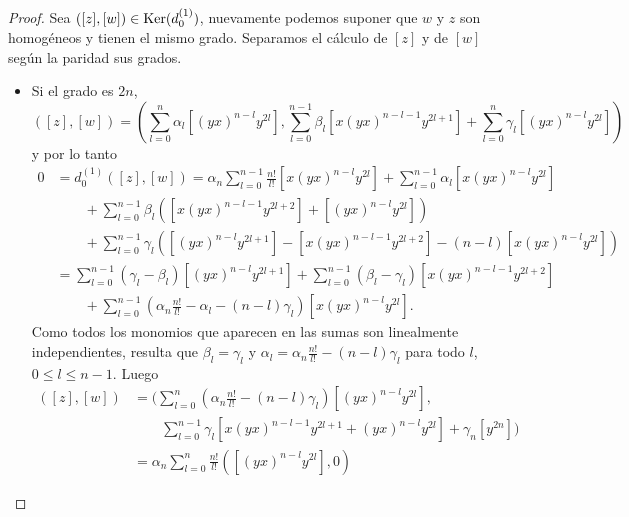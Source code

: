 \documentclass[fleqn,../tesis.tex]{subfiles}
\begin{document}
\begin{proof}
    Sea $\left([z], [w]\right) \in \operatorname{Ker}(d_{0}^{(1)})$, nuevamente podemos suponer que $w$ y $z$ son homogéneos y tienen el mismo grado.
    Separamos el cálculo de $[z]$ y de $[w]$ según la paridad sus grados.
    \begin{itemize}
        \item Si el grado es $2n$,
            \[
                ([z], [w]) = \left( \sum_{l = 0}^{n} \alpha_l\left[(yx)^{n - l}y^{2l}\right],
                    \sum_{l = 0}^{n - 1}\beta_l \left[x (yx)^{n - l - 1}y^{2l + 1}\right]
                        +  \sum_{l = 0}^{n} \gamma_l\left[(yx)^{n - l}y^{2l}\right]\right)               
            \]
        y por lo tanto
        \begin{align*}
            0 &= d_{0}^{(1)}([z], [w]) = \alpha_n \sum_{l = 0}^{n - 1}\frac{n!}{l!}\left[x(yx)^{n - l}y^{2l}\right]
               + \sum_{l = 0}^{n - 1}\alpha_l \left[x(yx)^{n - l}y^{2l}\right]\\
            &\qquad  + \sum_{l = 0}^{n - 1}\beta_l \left(\left[x(yx)^{n - l - 1}y^{2l + 2}\right] + \left[(yx)^{n - l}y^{2l} \right] \right)\\
            &\qquad + \sum_{l = 0}^{n - 1}\gamma_l \left(\left[(yx)^{n - l}y^{2l + 1} \right]
                - \left[x(yx)^{n - l - 1}y^{2l + 2}\right] - (n - l)\left[x(yx)^{n - l}y^{2l} \right]\right)\\
            &= \sum_{l = 0}^{n - 1}(\gamma_l - \beta_l)\left[(yx)^{n - l}y^{2l + 1}\right]
                + \sum_{l = 0}^{n - 1}(\beta_l - \gamma_l)\left[ x(yx)^{n - l - 1}y^{2l + 2} \right] \\
            &\qquad + \sum_{l = 0}^{n - 1}\left( \alpha_n \frac{n!}{l!} - \alpha_l -(n - l)\gamma_l \right)\left[x(yx)^{n - l}y^{2l}\right].
        \end{align*}
        Como todos los monomios que aparecen en las sumas son linealmente independientes, resulta que $\beta_l = \gamma_l$
            y $\alpha_l = \alpha_n \frac{n!}{l!} - (n - l)\gamma_l$ para todo $l$, $0 \leq l \leq n - 1$. Luego
        \begin{align*}
            ([z], [w]) &= \Bigg(\sum_{l = 0}^{n}\left(\alpha_n \frac{n!}{l!} - (n - l)\gamma_l\right)\left[(yx)^{n - l}y^{2l}\right],\\
                &\qquad \sum_{l = 0}^{n - 1}\gamma_l\left[ x(yx)^{n - l-1 }y^{2l + 1} + (yx)^{n - l}y^{2l}\right]
                    + \gamma_n\left[y^{2n}\right]\Bigg)\\
            &= \alpha_n \sum_{l = 0}^n\frac{n!}{l!}\left( \left[(yx)^{n - l}y^{2l} \right], 0 \right)

\end{align*}
\end{itemize}
\end{proof}
\end{document}
